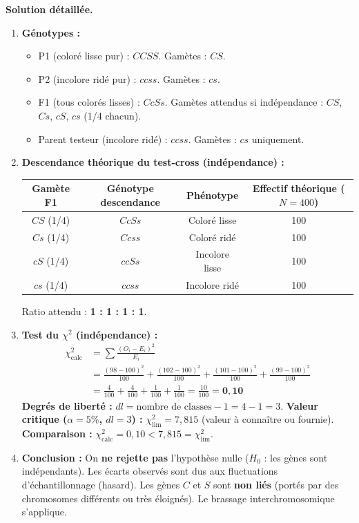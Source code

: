 \documentclass[11pt]{article}
\begin{document}
\begin{exoresolu}
\textbf{Solution détaillée.}
\begin{enumerate}
    \item \textbf{Génotypes :}
    \begin{itemize}
        \item P1 (coloré lisse pur) : $CCSS$. Gamètes : $CS$.
        \item P2 (incolore ridé pur) : $ccss$. Gamètes : $cs$.
        \item F1 (tous colorés lisses) : $CcSs$. Gamètes attendus si indépendance : $CS$, $Cs$, $cS$, $cs$ (1/4 chacun).
        \item Parent testeur (incolore ridé) : $ccss$. Gamètes : $cs$ uniquement.
    \end{itemize}
    \item \textbf{Descendance théorique du test-cross (indépendance) :}
    \begin{center}
    \begin{tabular}{|c|c|c|c|}\hline
    Gamète F1 & Génotype descendance & Phénotype & Effectif théorique ($N=400$) \\ \hline
    $CS$ (1/4) & $CcSs$ & Coloré lisse & 100 \\ \hline
    $Cs$ (1/4) & $Ccss$ & Coloré ridé & 100 \\ \hline
    $cS$ (1/4) & $ccSs$ & Incolore lisse & 100 \\ \hline
    $cs$ (1/4) & $ccss$ & Incolore ridé & 100 \\ \hline
    \end{tabular}
    \end{center}
    Ratio attendu : \textbf{1 : 1 : 1 : 1}.
    \item \textbf{Test du $\chi^2$ (indépendance) :}
    \begin{align*}
    \chi^2_{\text{calc}} &= \sum \frac{(O_i - E_i)^2}{E_i} \\
    &= \frac{(98-100)^2}{100} + \frac{(102-100)^2}{100} + \frac{(101-100)^2}{100} + \frac{(99-100)^2}{100} \\
    &= \frac{4}{100} + \frac{4}{100} + \frac{1}{100} + \frac{1}{100} = \frac{10}{100} = \mathbf{0,10}
    \end{align*}
    \textbf{Degrés de liberté :} $dl = \text{nombre de classes} - 1 = 4 - 1 = 3$.
    \textbf{Valeur critique ($\alpha = 5\%$, $dl=3$) :} $\chi^2_{\text{lim}} = 7,815$ (valeur à connaître ou fournie).
    \textbf{Comparaison :} $\chi^2_{\text{calc}} = 0,10 < 7,815 = \chi^2_{\text{lim}}$.
    \item \textbf{Conclusion :} On \textbf{ne rejette pas} l'hypothèse nulle ($H_0$ : les gènes sont indépendants). Les écarts observés sont dus aux fluctuations d'échantillonnage (hasard). Les gènes $C$ et $S$ sont \textbf{non liés} (portés par des chromosomes différents ou très éloignés). Le brassage interchromosomique s'applique.
\end{enumerate}
\end{exoresolu}
\end{document}

